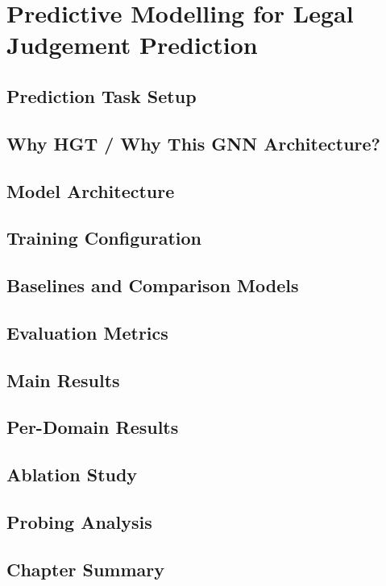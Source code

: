 \chapter{Predictive Modelling for Legal Judgement Prediction}

\section{Prediction Task Setup}
\section{Why HGT / Why This GNN Architecture?}
\section{Model Architecture}
\section{Training Configuration}
\section{Baselines and Comparison Models}
\section{Evaluation Metrics}
\section{Main Results}
\section{Per-Domain Results}
\section{Ablation Study}
\section{Probing Analysis}
\section{Chapter Summary}
